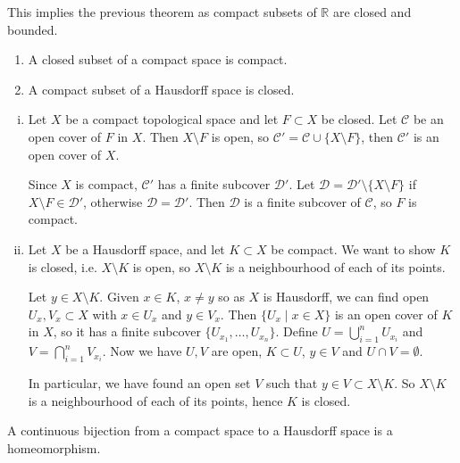 \documentclass[12pt]{article}
\begin{document}
\begin{remark}
	This implies the previous theorem as compact subsets of $\mathbb{R}$ are closed and bounded.
\end{remark}

\begin{lemma}
	\begin{enumerate}[\normalfont(i)]
		\item A closed subset of a compact space is compact.
		\item A compact subset of a Hausdorff space is closed.
	\end{enumerate}
\end{lemma}

\begin{proofbox}
	\begin{enumerate}[(i)]
		\item Let $X$ be a compact topological space and let $F \subset X$ be closed. Let $\mathcal{C}$ be an open cover of $F$ in $X$. Then $X \setminus F$ is open, so $\mathcal{C}' = \mathcal{C} \cup \{X \setminus F\}$, then $\mathcal{C}'$ is an open cover of $X$.

			Since $X$ is compact, $\mathcal{C}'$ has a finite subcover $\mathcal{D}'$. Let $\mathcal{D} = \mathcal{D}' \setminus\{X \setminus F\}$ if $X \setminus F \in \mathcal{D}'$, otherwise $\mathcal{D} = \mathcal{D}'$. Then $\mathcal{D}$ is a finite subcover of $\mathcal{C}$, so $F$ is compact.
		\item Let $X$ be a Hausdorff space, and let $K \subset X$ be compact. We want to show $K$ is closed, i.e. $X \setminus K$ is open, so $X \setminus K$ is a neighbourhood of each of its points.

			Let $y \in X \setminus K$. Given $x \in K$, $x \neq y$ so as $X$ is Hausdorff, we can find open $U_x, V_x \subset X$ with $x \in U_x$ and $y \in V_x$. Then $\{U_x \mid x \in X\}$ is an open cover of $K$ in $X$, so it has a finite subcover $\{U_{x_1}, \ldots, U_{x_n}\}$. Define $U = \bigcup_{i = 1}^{n} U_{x_i}$ and $V = \bigcap_{i = 1}^{n} V_{x_i}$. Now we have $U, V$ are open, $K \subset U$, $y \in V$ and $U \cap V = \emptyset$.

			In particular, we have found an open set $V$ such that $y \in V \subset X \setminus K$. So $X \setminus K$ is a neighbourhood of each of its points, hence $K$ is closed.
	\end{enumerate}
\end{proofbox}

\begin{theorem}
	A continuous bijection from a compact space to a Hausdorff space is a homeomorphism.
\end{theorem}
\end{document}
